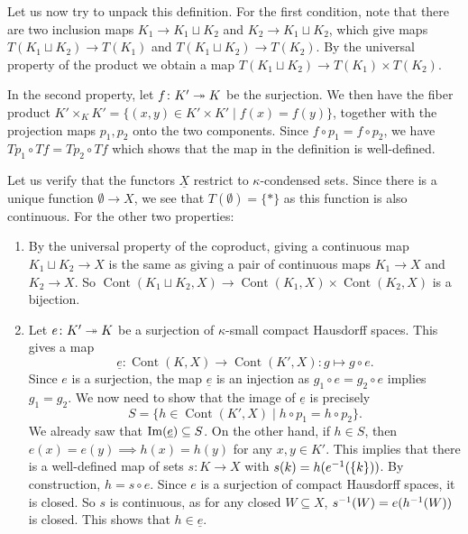 \documentclass{article}
\DeclareMathOperator{\Cont}{Cont}
\begin{document}
Let us now try to unpack this definition.
For the first condition, note that there are two inclusion maps
$K_1 \to K_1 \sqcup K_2$ and $K_2 \to K_1 \sqcup K_2$, which give
maps $T(K_1 \sqcup K_2) \to T(K_1)$ and $T(K_1 \sqcup K_2) \to T(K_2)$.
By the universal property of the product we obtain a map
$T(K_1 \sqcup K_2) \to T(K_1) \times T(K_2)$.

In the second property, let $f\colon K' \twoheadrightarrow K$ be the surjection.
We then have the fiber product $K' \times_K K' = \{(x,y)\in K' \times K' \mid f(x) = f(y)\}$,
together with the projection maps $p_1, p_2$ onto the two components.
Since $f\circ p_1 = f \circ p_2$, we have $Tp_1 \circ Tf = Tp_2 \circ Tf$
which shows that the map in the definition is well-defined.

Let us verify that the functors $\underline{X}$ restrict
to $\kappa$-condensed sets. Since there is a unique function
$\emptyset \to X$, we see that $T(\emptyset) = \{*\}$ as this function
is also continuous. For the other two properties:
\begin{enumerate}
    \item By the universal property of the coproduct, giving
          a continuous map $K_1 \sqcup K_2 \to X$ is the same as giving
          a pair of
          continuous maps $K_1 \to X$ and $K_2 \to X$.
          So $\Cont(K_1 \sqcup K_2, X) \to \Cont(K_1, X) \times \Cont(K_2, X)$
          is a bijection.
    \item Let $e\colon K' \twoheadrightarrow K$ be a surjection of $\kappa$-small
          compact Hausdorff spaces. This gives a map
          \begin{equation*}
              \underline{e} \colon \Cont(K, X) \to \Cont(K', X) \colon g \mapsto g\circ e.
          \end{equation*}
          Since $e$ is a surjection, the map $\underline{e}$ is an injection as
          $g_1\circ e = g_2 \circ e$ implies $g_1 = g_2$. We now need
          to show that the image of $\underline{e}$ is precisely
          \begin{equation*}
              S = \{h \in \Cont(K' , X) \mid h\circ p_1 = h\circ p_2\}.
          \end{equation*}
          We already saw that $\operatorname{Im}(\underline{e}) \subseteq S$. On the other hand,
          if $h \in S$, then $e(x) = e(y) \implies h(x) = h(y)$ for
          any $x,y\in K'$. This implies that there is a well-defined
          map of sets $s\colon K \to X$ with $s(k) = h(e^{-1}(\{k\}))$.
          By construction, $h = s\circ e$. Since $e$ is a surjection
          of compact Hausdorff spaces, it is closed. So $s$ is continuous,
          as for any closed $W \subseteq X$, $s^{-1}(W) = e(h^{-1}(W))$
          is closed. This shows that $h\in \underline{e}$.
\end{enumerate}
\end{document}
